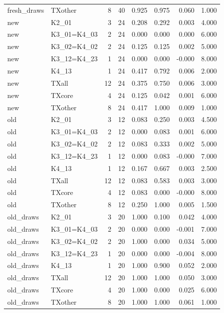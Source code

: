 \documentclass[10pt,a4paper]{article}
\begin{document}
{\begin{longtable}{llrrrrrr}
fresh\_draws & TXother & 8 & 40 & 0.925 & 0.975 & 0.060 & 1.000 \\
new & K2\_01 & 3 & 24 & 0.208 & 0.292 & 0.003 & 4.000 \\
new & K3\_01=K4\_03 & 2 & 24 & 0.000 & 0.000 & 0.000 & 6.000 \\
new & K3\_02=K4\_02 & 2 & 24 & 0.125 & 0.125 & 0.002 & 5.000 \\
new & K3\_12=K4\_23 & 1 & 24 & 0.000 & 0.000 & -0.000 & 8.000 \\
new & K4\_13 & 1 & 24 & 0.417 & 0.792 & 0.006 & 2.000 \\
new & TXall & 12 & 24 & 0.375 & 0.750 & 0.006 & 3.000 \\
new & TXcore & 4 & 24 & 0.125 & 0.042 & 0.001 & 6.000 \\
new & TXother & 8 & 24 & 0.417 & 1.000 & 0.009 & 1.000 \\
old & K2\_01 & 3 & 12 & 0.083 & 0.250 & 0.003 & 4.500 \\
old & K3\_01=K4\_03 & 2 & 12 & 0.000 & 0.083 & 0.001 & 6.000 \\
old & K3\_02=K4\_02 & 2 & 12 & 0.083 & 0.333 & 0.002 & 5.000 \\
old & K3\_12=K4\_23 & 1 & 12 & 0.000 & 0.083 & -0.000 & 7.000 \\
old & K4\_13 & 1 & 12 & 0.167 & 0.667 & 0.003 & 2.500 \\
old & TXall & 12 & 12 & 0.083 & 0.583 & 0.003 & 3.000 \\
old & TXcore & 4 & 12 & 0.083 & 0.000 & -0.000 & 8.000 \\
old & TXother & 8 & 12 & 0.250 & 1.000 & 0.005 & 1.500 \\
old\_draws & K2\_01 & 3 & 20 & 1.000 & 0.100 & 0.042 & 4.000 \\
old\_draws & K3\_01=K4\_03 & 2 & 20 & 0.000 & 0.000 & -0.001 & 7.000 \\
old\_draws & K3\_02=K4\_02 & 2 & 20 & 1.000 & 0.000 & 0.034 & 5.000 \\
old\_draws & K3\_12=K4\_23 & 1 & 20 & 0.000 & 0.000 & -0.004 & 8.000 \\
old\_draws & K4\_13 & 1 & 20 & 1.000 & 0.900 & 0.052 & 2.000 \\
old\_draws & TXall & 12 & 20 & 1.000 & 1.000 & 0.050 & 3.000 \\
old\_draws & TXcore & 4 & 20 & 1.000 & 0.000 & 0.025 & 6.000 \\
old\_draws & TXother & 8 & 20 & 1.000 & 1.000 & 0.061 & 1.000 \\
\bottomrule
\end{longtable}}
\end{document}
